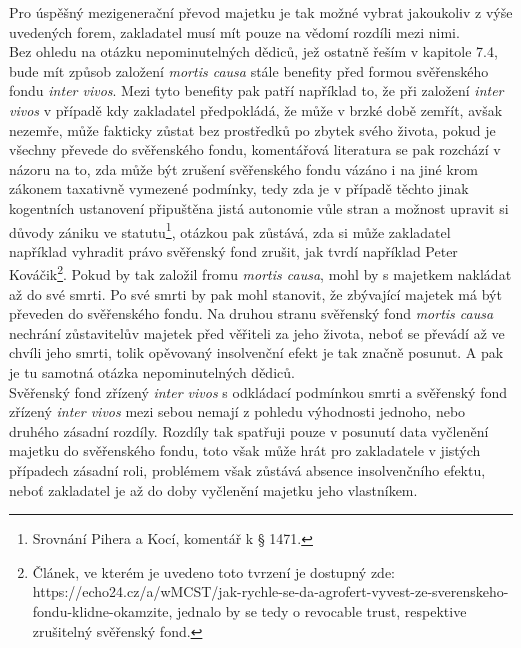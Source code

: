\documentclass{article}
\begin{document}
Pro úspěšný mezigenerační převod majetku je tak možné vybrat jakoukoliv z výše uvedených forem, zakladatel musí mít pouze na vědomí rozdíli mezi nimi.\\


Bez ohledu na otázku nepominutelných dědiců, jež ostatně řeším v kapitole 7.4, bude mít způsob založení \textit{mortis causa} stále benefity před formou svěřenského fondu \textit{inter vivos}. Mezi tyto benefity pak patří například to, že při založení \textit{inter vivos} v případě kdy zakladatel předpokládá, že může v brzké době zemřít, avšak nezemře, může fakticky zůstat bez prostředků po zbytek svého života, pokud je všechny převede do svěřenského fondu, komentářová literatura se pak rozchází v názoru na to, zda může být zrušení svěřenského fondu vázáno i na jiné krom zákonem taxativně vymezené podmínky, tedy zda je v případě těchto jinak kogentních ustanovení připuštěna jistá autonomie vůle stran a možnost upravit si důvody zániku ve statutu\footnote{Srovnání Pihera a Kocí, komentář k § 1471.}, otázkou pak zůstává, zda si může zakladatel například vyhradit právo svěřenský fond zrušit, jak tvrdí například Peter Kováčik\footnote{Článek, ve kterém je uvedeno toto tvrzení je dostupný zde: https://echo24.cz/a/wMCST/jak-rychle-se-da-agrofert-vyvest-ze-sverenskeho-fondu-klidne-okamzite, jednalo by se tedy o revocable trust, respektive zrušitelný svěřenský fond.}. Pokud by tak založil fromu \textit{mortis causa}, mohl by s majetkem nakládat až do své smrti. Po své smrti by pak mohl stanovit, že zbývající majetek má být převeden do svěřenského fondu. Na druhou stranu svěřenský fond \textit{mortis causa} nechrání zůstavitelův majetek před věřiteli za jeho života, neboť se převádí až ve chvíli jeho smrti, tolik opěvovaný insolvenční efekt je tak značně posunut. A pak je tu samotná otázka nepominutelných dědiců.\\


Svěřenský fond zřízený \textit{inter vivos} s odkládací podmínkou smrti a svěřenský fond zřízený \textit{inter vivos} mezi sebou nemají z pohledu výhodnosti jednoho, nebo druhého zásadní rozdíly. Rozdíly tak spatřuji pouze v posunutí data vyčlenění majetku do svěřenského fondu, toto však může hrát pro zakladatele v jistých případech zásadní roli, problémem však zůstává absence insolvenčního efektu, neboť zakladatel je až do doby vyčlenění majetku jeho vlastníkem.\\
\end{document}

